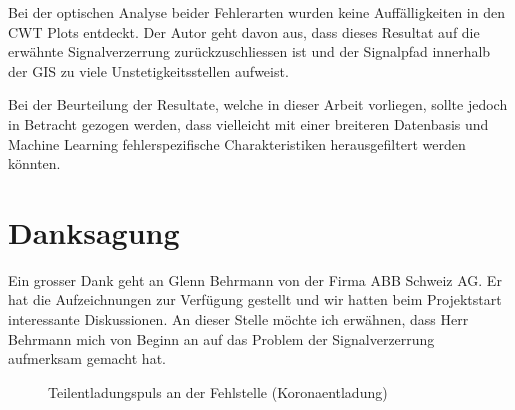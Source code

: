 \begin{refsection}
Bei der optischen Analyse beider Fehlerarten wurden keine Auffälligkeiten in den CWT Plots entdeckt. 
Der Autor geht davon aus, dass dieses Resultat auf die erwähnte Signalverzerrung zurückzuschliessen ist und der Signalpfad innerhalb der GIS zu viele Unstetigkeitsstellen aufweist.

Bei der Beurteilung der Resultate, welche in dieser Arbeit vorliegen, sollte jedoch in Betracht gezogen werden, dass vielleicht mit einer breiteren Datenbasis und Machine Learning fehlerspezifische Charakteristiken herausgefiltert werden könnten. 
%

\section{Danksagung}
Ein grosser Dank geht an Glenn Behrmann von der Firma ABB Schweiz AG. 
Er hat die Aufzeichnungen zur Verfügung gestellt und wir hatten beim Projektstart interessante Diskussionen. An dieser Stelle möchte ich erwähnen, dass Herr Behrmann mich von Beginn an auf das Problem der Signalverzerrung aufmerksam gemacht hat.

\begin{figure}
	\centering
    \caption{Teilentladungspuls an der Fehlstelle (Koronaentladung) \cite{skript:Judd24ps}}
	\label{fig:Teilentaldungspuls}
\end{figure}

\printbibliography[heading=subbibliography]
\end{refsection}
